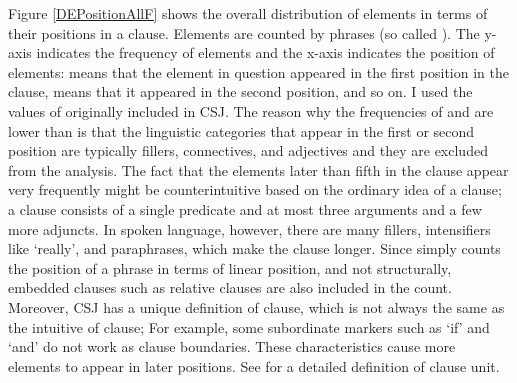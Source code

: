 Figure \ref{DEPositionAllF} shows the overall distribution of elements
in terms of their positions in a clause.
Elements are counted by phrases (so called ).
The y-axis indicates the frequency of elements and
the x-axis indicates the position of elements:
 means that the element in question appeared in the first position in the clause,
 means that it appeared in the second position,
and so on.
I used the values of  originally included in CSJ.
The reason why the frequencies of  and  are lower than  is that
the linguistic categories that appear in the first or second position
are typically fillers, connectives, and adjectives and
they are excluded from the analysis.
The fact that the elements later than fifth in the clause appear very frequently
might be counterintuitive based on the ordinary idea of a clause;
a clause consists of a single predicate and at most three arguments and a few more adjuncts.
In spoken language, however,
there are many fillers, intensifiers like  `really', and paraphrases,
which make the clause longer.
Since  simply counts the position of a phrase in terms of linear position, and not structurally,
embedded clauses such as relative clauses are also included in the count.
Moreover,
CSJ has a unique definition of clause, which is not always the same as the intuitive of clause;
For example,
some subordinate markers such as  `if' and  `and' do not work as clause boundaries.
These characteristics cause more elements to appear in later positions.
See  for a detailed definition of clause unit.


